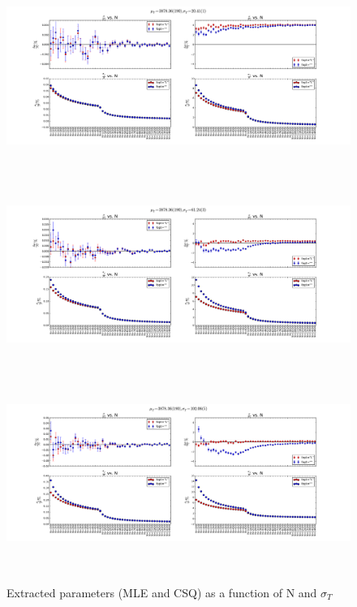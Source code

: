 \documentclass[12pt]{article}
\begin{document}
\begin{figure}[ht]
	\includegraphics[height=2.5in,width=5.5in]{fit-comp_MU-190_SG-1_fit-opt-L_binw-1.pdf}
	\includegraphics[height=2.5in,width=5.5in]{fit-comp_MU-190_SG-3_fit-opt-L_binw-1.pdf}
	\includegraphics[height=2.5in,width=5.5in]{fit-comp_MU-190_SG-5_fit-opt-L_binw-1.pdf}
	\caption{Extracted parameters (MLE and CSQ) as a function of N and $\sigma_{T}$}
	\label{fig2}
\end{figure}

\clearpage
\end{document}
